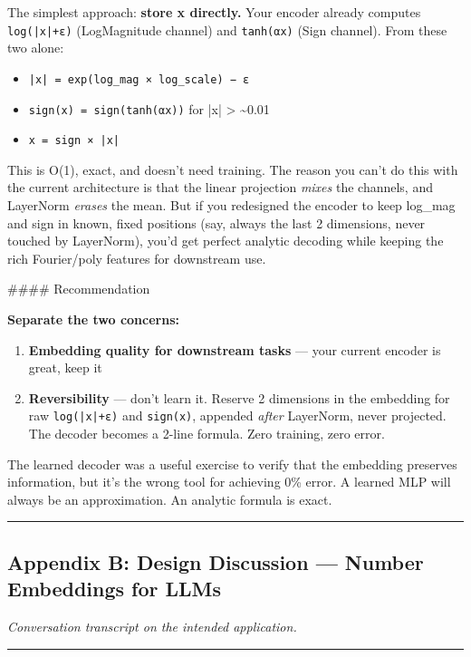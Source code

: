 \documentclass[11pt]{article}
\begin{document}
The simplest approach: \textbf{store x directly.} Your encoder already computes \texttt{log(|x|+ε)} (LogMagnitude channel) and \texttt{tanh(αx)} (Sign channel). From these two alone:

\begin{itemize}
\item \texttt{|x| = exp(log\_mag × log\_scale) − ε}
\item \texttt{sign(x) = sign(tanh(αx))} for |x| > \textasciitilde{}0.01
\item \texttt{x = sign × |x|}
\end{itemize}


This is O(1), exact, and doesn't need training. The reason you can't do this with the current architecture is that the linear projection \emph{mixes} the channels, and LayerNorm \emph{erases} the mean. But if you redesigned the encoder to keep log\_mag and sign in known, fixed positions (say, always the last 2 dimensions, never touched by LayerNorm), you'd get perfect analytic decoding while keeping the rich Fourier/poly features for downstream use.


\#\#\#\# Recommendation


\textbf{Separate the two concerns:}

\begin{enumerate}
\item \textbf{Embedding quality for downstream tasks} — your current encoder is great, keep it
\item \textbf{Reversibility} — don't learn it. Reserve 2 dimensions in the embedding for raw \texttt{log(|x|+ε)} and \texttt{sign(x)}, appended \emph{after} LayerNorm, never projected. The decoder becomes a 2-line formula. Zero training, zero error.
\end{enumerate}


The learned decoder was a useful exercise to verify that the embedding preserves information, but it's the wrong tool for achieving 0\% error. A learned MLP will always be an approximation. An analytic formula is exact.


\noindent\rule{\textwidth}{0.4pt}


\subsection*{Appendix B: Design Discussion — Number Embeddings for LLMs}


\emph{Conversation transcript on the intended application.}


\noindent\rule{\textwidth}{0.4pt}
\end{document}
